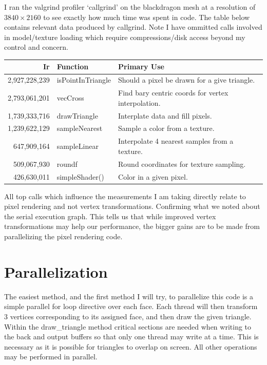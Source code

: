 \documentclass[12pt]{article}
\begin{document}
I ran the valgrind profiler `callgrind' on the blackdragon mesh at a resolution of 
$3840\times2160$ to see exactly how much time was spent in code. 
The table below contains relevant data produced by callgrind.
Note I have ommitted calls involved in model/texture loading which require compressions/disk access beyond
my control and concern.

\begin{center}
	\begin{tabular}{|r|l|l|}
		\hline
		Ir & Function & Primary Use \\ \hline
		2,927,228,239 & isPointInTriangle & Should a pixel be drawn for a give triangle. \\ \hline
		2,793,061,201 & vecCross & Find bary centric coords for vertex interpolation. \\ \hline
		1,739,333,716 & drawTriangle & Interplate data and fill pixels. \\ \hline
		1,239,622,129 & sampleNearest & Sample a color from a texture. \\ \hline
		647,909,164 & sampleLinear & Interpolate 4 nearest samples from a texture.\\ \hline
		509,067,930 & roundf & Round coordinates for texture sampling. \\ \hline
		426,630,011 & simpleShader() & Color in a given pixel. \\ \hline
	\end{tabular}
\end{center}

All top calls which influence the measurements I am taking directly relate to pixel rendering and not
vertex transformations. Confirming what we noted about the serial execution graph. This tells us 
that while improved vertex transformations may help our performance, the bigger gains are to be made
from parallelizing the pixel rendering code.

\section*{Parallelization}

The easiest method, and the first method I will try, to parallelize this code is a simple parallel for
loop directive over each face. Each thread will then transform 3 vertices corresponding to its assigned
face, and then draw the given triangle. Within the draw\_triangle method critical sections are needed
when writing to the back and output buffers so that only one thread may write at a time. This is
necessary as it is possible for triangles to overlap on screen. All other
operations may be performed in parallel.
\end{document}
